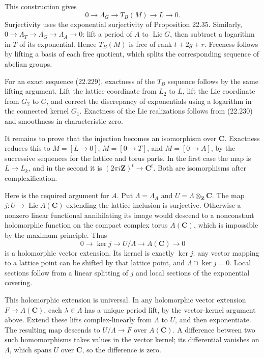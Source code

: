 \documentclass[
  11pt,
  a4paper,
]{article}
\begin{document}
This construction gives \[
 0\longrightarrow\Lambda_G\longrightarrow T_B(M)
       \longrightarrow L\longrightarrow0.
 \tag{22.235}
\] Surjectivity uses the exponential surjectivity of Proposition 22.35.
Similarly, \(0\to\Lambda_T\to\Lambda_G\to\Lambda_A\to0\): lift a period
of \(A\) to \(\operatorname{Lie}G\), then subtract a logarithm in \(T\)
of its exponential. Hence \(T_B(M)\) is free of rank \(t+2g+r\).
Freeness follows by lifting a basis of each free quotient, which splits
the corresponding sequence of abelian groups.

For an exact sequence (22.229), exactness of the \(T_B\) sequence
follows by the same lifting argument. Lift the lattice coordinate from
\(L_2\) to \(L\), lift the Lie coordinate from \(G_2\) to \(G\), and
correct the discrepancy of exponentials using a logarithm in the
connected kernel \(G_1\). Exactness of the Lie realizations follows from
(22.230) and smoothness in characteristic zero.

It remains to prove that the injection becomes an isomorphism over
\(\mathbf C\). Exactness reduces this to \(M=[L\to0]\), \(M=[0\to T]\),
and \(M=[0\to A]\), by the successive sequences for the lattice and
torus parts. In the first case the map is \(L\to L_k\), and in the
second it is \((2\pi i\mathbf Z)^t\to\mathbf C^t\). Both are
isomorphisms after complexification.

Here is the required argument for \(A\). Put \(\Lambda=\Lambda_A\) and
\(U=\Lambda\otimes_{\mathbf Z}\mathbf C\). The map
\(j:U\to\operatorname{Lie}A(\mathbf C)\) extending the lattice inclusion
is surjective. Otherwise a nonzero linear functional annihilating its
image would descend to a nonconstant holomorphic function on the compact
complex torus \(A(\mathbf C)\), which is impossible by the maximum
principle. Thus \[
 0\longrightarrow\ker j\longrightarrow U/\Lambda
       \longrightarrow A(\mathbf C)\longrightarrow0
 \tag{22.236}
\] is a holomorphic vector extension. Its kernel is exactly \(\ker j\):
any vector mapping to a lattice point can be shifted by that lattice
point, and \(\Lambda\cap\ker j=0\). Local sections follow from a linear
splitting of \(j\) and local sections of the exponential covering.

This holomorphic extension is universal. In any holomorphic vector
extension \(F\to A(\mathbf C)\), each \(\lambda\in\Lambda\) has a unique
period lift, by the vector-kernel argument above. Extend these lifts
complex-linearly from \(\Lambda\) to \(U\), and then exponentiate. The
resulting map descends to \(U/\Lambda\to F\) over \(A(\mathbf C)\). A
difference between two such homomorphisms takes values in the vector
kernel; its differential vanishes on \(\Lambda\), which spans \(U\) over
\(\mathbf C\), so the difference is zero.
\end{document}

